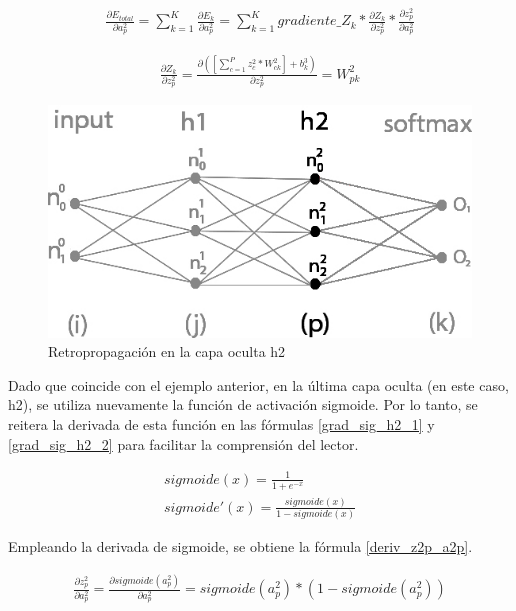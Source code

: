 \begin{gather}
	\frac{\partial E_{total}}{\partial a^2_p} = \sum_{k=1}^K \frac{\partial E_k}{\partial a^2_p} = \sum_{k=1}^K  gradiente\_Z_k * \frac{\partial Z_k}{\partial z^2_p} * \frac{\partial z^2_p}{\partial a^2_p}
	\label{E_total_a2p}
\end{gather}

\begin{gather}
	\frac{\partial Z_k}{\partial z^2_p} = \frac{\partial( [\sum_{c=1}^{P} z^2_c * W^2_{ck}] + b^3_k)}{\partial z^2_p} = W^2_{pk}
	\label{deriv_Zk_z2p}
\end{gather}

\begin{figure}[H]
	\centering
	\includegraphics[scale=0.35]{imagenes/nn_2_capa_h2.jpg}  
	\caption{Retropropagación en la capa oculta h2}
	\label{fig:nn_2_capa_h2}
\end{figure}

Dado que coincide con el ejemplo anterior, en la última capa oculta (en este caso, h2), se utiliza nuevamente la función de activación sigmoide. Por lo tanto, se reitera la derivada de esta función en las fórmulas \ref{grad_sig_h2_1} y \ref{grad_sig_h2_2} para facilitar la comprensión del lector.

\begin{gather}
	sigmoide(x) = \frac{1}{1+e^{-x}} \label{grad_sig_h2_1} \\
	sigmoide'(x) = \frac{sigmoide(x)}{1-sigmoide(x)} \label{grad_sig_h2_2}
\end{gather}


Empleando la derivada de sigmoide, se obtiene la fórmula \ref{deriv_z2p_a2p}.

\begin{gather}
	\frac{\partial z^2_ p}{\partial a^2_p} = \frac{\partial sigmoide(a^2_p)}{\partial a^2_p} = sigmoide(a^2_p)*(1-sigmoide(a^2_p))
	\label{deriv_z2p_a2p}
\end{gather}

